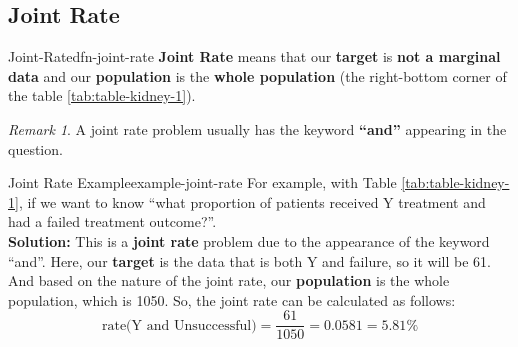 \documentclass[math,code]{amznotes}
\theoremstyle{remark}
\newtheorem*{remark}{Remark}
\begin{document}
\subsection{Joint Rate}
\begin{dfnbox}{Joint-Rate}{dfn-joint-rate}
    {\color{red} \textbf{Joint Rate}} means that our \textbf{target} is \textbf{not a marginal data} and our \textbf{population} is the \textbf{whole population} (the right-bottom corner of the table \ref{tab:table-kidney-1}).
\end{dfnbox}
\begin{notebox}
    \begin{remark}
        A joint rate problem usually has the keyword \textbf{``and''} appearing in the question.
    \end{remark}
\end{notebox}
\begin{exbox}{Joint Rate Example}{example-joint-rate}
    For example, with Table \ref{tab:table-kidney-1}, if we want to know ``what proportion of patients received Y treatment and had a failed treatment outcome?''. \\
    \textbf{Solution:} This is a \textbf{joint rate} problem due to the appearance of the keyword ``and''. Here, our \textbf{target} is the data that is both Y and failure, so it will be 61. And based on the nature of the joint rate, our \textbf{population} is the whole population, which is 1050. So, the joint rate can be calculated as follows:
    \begin{displaymath}
        \text{rate(Y and Unsuccessful)}=\frac{61}{1050}=0.0581=5.81\%
    \end{displaymath}
\end{exbox}
\end{document}
